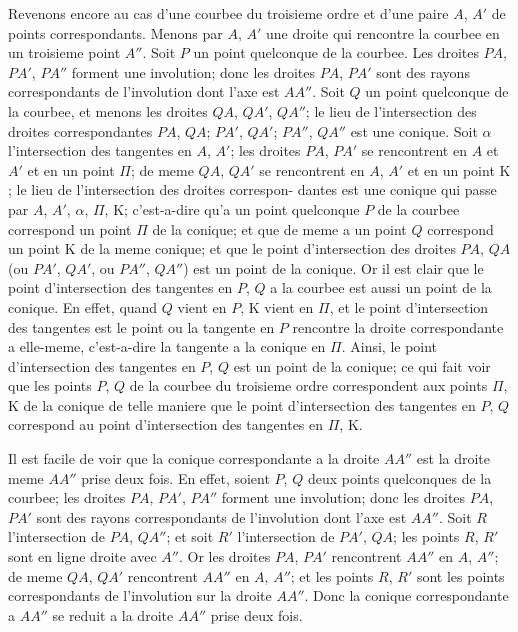 \documentclass[11pt,a4paper]{article}
\begin{document}
Revenons encore au cas d'une courbee du troisieme ordre et d'une paire $A$, $A'$
de points correspondants. Menons par $A$, $A'$ une droite qui rencontre la courbee en un
troisieme point $A''$. Soit $P$ un point quelconque de la courbee. Les droites $PA$, $PA'$, $PA''$
forment une involution; donc les droites $PA$, $PA'$ sont des rayons correspondants de
l'involution dont l'axe est $AA''$. Soit $Q$ un point quelconque de la courbee, et menons
les droites $QA$, $QA'$, $QA''$; le lieu de l'intersection des droites correspondantes $PA$, $QA$;
$PA'$, $QA'$; $PA''$, $QA''$ est une conique. Soit $\alpha$ l'intersection des tangentes en $A$, $A'$; les
droites $PA$, $PA'$ se rencontrent en $A$ et $A'$ et en un point $\Pi$; de meme $QA$, $QA'$ se
rencontrent en $A$, $A'$ et en un point $\mathrm{K}$; le lieu de l'intersection des droites correspon-
dantes est une conique qui passe par $A$, $A'$, $\alpha$, $\Pi$, $\mathrm{K}$; c'est-a-dire qu'a un point quelconque
$P$ de la courbee correspond un point $\Pi$ de la conique; et que de meme a un point $Q$
correspond un point $\mathrm{K}$ de la meme conique; et que le point d'intersection des droites
$PA$, $QA$ (ou $PA'$, $QA'$, ou $PA''$, $QA''$) est un point de la conique. Or il est clair que le
point d'intersection des tangentes en $P$, $Q$ a la courbee est aussi un point de la conique.
En effet, quand $Q$ vient en $P$, $\mathrm{K}$ vient en $\Pi$, et le point d'intersection des tangentes
est le point ou la tangente en $P$ rencontre la droite correspondante a elle-meme, c'est-a-dire
la tangente a la conique en $\Pi$. Ainsi, le point d'intersection des tangentes en $P$, $Q$ est
un point de la conique; ce qui fait voir que les points $P$, $Q$ de la courbee du troisieme
ordre correspondent aux points $\Pi$, $\mathrm{K}$ de la conique de telle maniere que le point
d'intersection des tangentes en $P$, $Q$ correspond au point d'intersection des tangentes
en $\Pi$, $\mathrm{K}$.

Il est facile de voir que la conique correspondante a la droite $AA''$ est la droite
meme $AA''$ prise deux fois. En effet, soient $P$, $Q$ deux points quelconques de la
courbee; les droites $PA$, $PA'$, $PA''$ forment une involution; donc les droites $PA$, $PA'$
sont des rayons correspondants de l'involution dont l'axe est $AA''$. Soit $R$ l'intersection
de $PA$, $QA''$; et soit $R'$ l'intersection de $PA'$, $QA$; les points $R$, $R'$ sont en ligne droite
avec $A''$. Or les droites $PA$, $PA'$ rencontrent $AA''$ en $A$, $A''$; de meme $QA$, $QA'$
rencontrent $AA''$ en $A$, $A''$; et les points $R$, $R'$ sont les points correspondants de
l'involution sur la droite $AA''$. Donc la conique correspondante a $AA''$ se reduit a la
droite $AA''$ prise deux fois.
\end{document}
